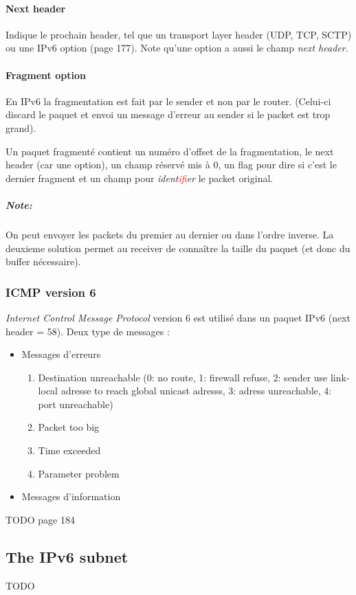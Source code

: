 \paragraph{Next header}
Indique le prochain header, tel que un transport layer header (UDP, TCP, SCTP) ou une
IPv6 option (page 177). Note qu'une option a aussi le champ \textit{next header}.

\paragraph{Fragment option}
En IPv6 la fragmentation est fait par le sender et non par le router. (Celui-ci discard
le paquet et envoi un message d'erreur au sender si le packet est trop grand).

Un paquet fragmenté contient un numéro d'offset de la fragmentation, le next header (car une option), un champ réservé mis à 0, un flag pour dire si c'est le dernier fragment et un
champ pour \textit{ident\textcolor{red}{if}ier} le packet original.

\subparagraph{Note:} On peut envoyer les packets du premier au dernier ou dans l'ordre inverse.
La deuxieme solution permet au receiver de connaître la taille du paquet (et donc du buffer
nécessaire).

\subsubsection{ICMP version 6}
\textit{Internet Control Message Protocol} version 6 est utilisé dans un paquet IPv6
(next header = 58). Deux type de messages :

\begin{itemize}
    \item Messages d'erreurs
        \begin{enumerate}
            \item Destination unreachable (0: no route, 1: firewall refuse, 2: sender use link-local adresse to reach global unicast adresss, 3: adress unreachable, 4: port unreachable)
            \item Packet too big
            \item Time exceeded
            \item Parameter problem
        \end{enumerate}
    \item Messages d'information
\end{itemize}
TODO page 184

\subsection{The IPv6 subnet}
TODO

